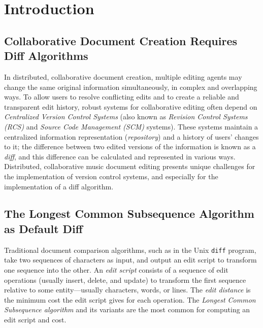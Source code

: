 \documentclass{article}
\title{\papertitle}
\begin{document}
%
\capstartfalse
\maketitle
\capstarttrue
%
\begin{abstract}
We describe an application of hierarchic diff to the collaborative
editing of tree-based music representations, using Zhang and Shasha's
tree edit distance algorithm as implemented within the XUDiff tool.
The edit distance between two trees is the minimum number of edit
operations necessary to transform one tree into the other.  We
consider common operations on the score tree---deleting, changing, and
appending tree nodes---to derive a minimal edit sequence, known as an
edit script, and we compare the performance of the widely used Longest
Common Subsequence algorithm against our approach. We conclude by summarizing implications for the design of collaborative music document software systems.
\end{abstract}
%

\section{Introduction}\label{sec:introduction}
\subsection{Collaborative Document Creation Requires Diff Algorithms}
In distributed, collaborative document creation, multiple editing agents may change the same original information simultaneously, in complex and overlapping ways. To allow users to resolve conflicting edits and to create a reliable and transparent edit history, robust systems for collaborative editing often depend on \emph{Centralized Version Control Systems} (also known as \emph{Revision Control Systems (RCS)} and \emph{Source Code Management (SCM)} systems). These systems maintain a centralized information representation (\emph{repository}) and a history of users' changes to it; the difference between two edited versions of the information is known as a \emph{diff}, and this difference can be calculated and represented in various ways. Distributed, collaborative music document editing presents unique challenges for the implementation of version control systems, and especially for the implementation of a diff algorithm.

\subsection{The Longest Common Subsequence Algorithm as Default Diff}
Traditional document comparison algorithms, such as in the Unix
\texttt{diff} program, take two sequences of characters as input, and
output an edit script to transform one sequence into the other.  An
\emph{edit script} consists of a sequence of edit operations (usually
insert, delete, and update) to transform the first sequence relative
to some entity---usually characters, words, or lines.  The \emph{edit
  distance} is the minimum cost the edit script gives for each
operation.  The \emph{Longest Common Subsequence algorithm} and its variants
are the most common for computing an edit script and cost.
\end{document}
